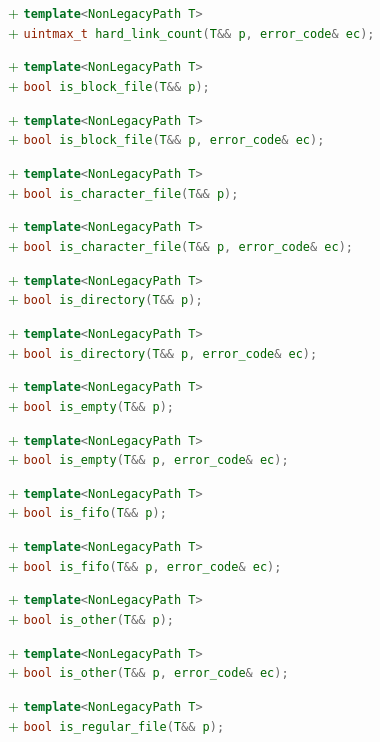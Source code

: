 \documentclass[11pt]{article}
\newcommand{\code}[2][cpp]{\lstinline[language=#1,basicstyle=\small\ttfamily]{#2}}
\newcommand{\tsreplace}[3]{\textcolor{red}{\sout{#1}}#2\textcolor{darkgreen}{#3}}
\begin{document}
\tsreplace{}{}{+ \code{template<NonLegacyPath T>}}\\
\tsreplace{}{}{+ \code{uintmax_t hard_link_count(T&& p, error_code& ec);}}

\tsreplace{}{}{+ \code{template<NonLegacyPath T>}}\\
\tsreplace{}{}{+ \code{bool is_block_file(T&& p);}}

\tsreplace{}{}{+ \code{template<NonLegacyPath T>}}\\
\tsreplace{}{}{+ \code{bool is_block_file(T&& p, error_code& ec);}}

\tsreplace{}{}{+ \code{template<NonLegacyPath T>}}\\
\tsreplace{}{}{+ \code{bool is_character_file(T&& p);}}

\tsreplace{}{}{+ \code{template<NonLegacyPath T>}}\\
\tsreplace{}{}{+ \code{bool is_character_file(T&& p, error_code& ec);}}

\tsreplace{}{}{+ \code{template<NonLegacyPath T>}}\\
\tsreplace{}{}{+ \code{bool is_directory(T&& p);}}

\tsreplace{}{}{+ \code{template<NonLegacyPath T>}}\\
\tsreplace{}{}{+ \code{bool is_directory(T&& p, error_code& ec);}}

\tsreplace{}{}{+ \code{template<NonLegacyPath T>}}\\
\tsreplace{}{}{+ \code{bool is_empty(T&& p);}}

\tsreplace{}{}{+ \code{template<NonLegacyPath T>}}\\
\tsreplace{}{}{+ \code{bool is_empty(T&& p, error_code& ec);}}

\tsreplace{}{}{+ \code{template<NonLegacyPath T>}}\\
\tsreplace{}{}{+ \code{bool is_fifo(T&& p);}}

\tsreplace{}{}{+ \code{template<NonLegacyPath T>}}\\
\tsreplace{}{}{+ \code{bool is_fifo(T&& p, error_code& ec);}}

\tsreplace{}{}{+ \code{template<NonLegacyPath T>}}\\
\tsreplace{}{}{+ \code{bool is_other(T&& p);}}

\tsreplace{}{}{+ \code{template<NonLegacyPath T>}}\\
\tsreplace{}{}{+ \code{bool is_other(T&& p, error_code& ec);}}

\tsreplace{}{}{+ \code{template<NonLegacyPath T>}}\\
\tsreplace{}{}{+ \code{bool is_regular_file(T&& p);}}
\end{document}

